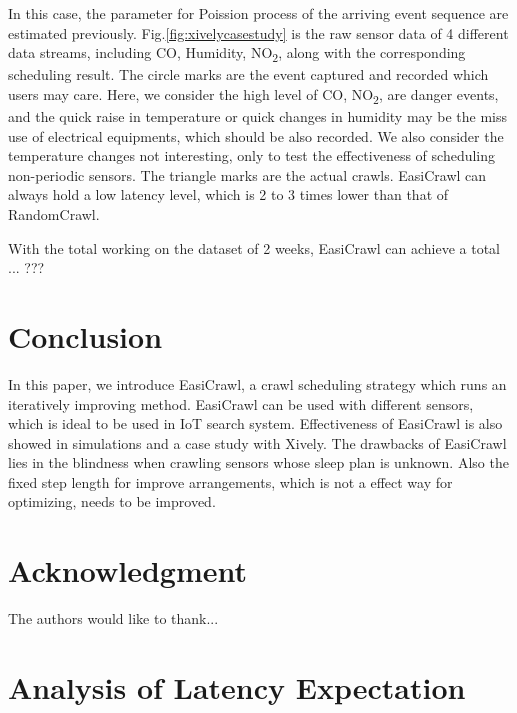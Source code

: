 \documentclass[conference]{IEEEtran}
\begin{document}
In this case, the parameter for Poission process of the arriving event sequence are estimated previously.
Fig.\ref{fig:xivelycasestudy} is the raw sensor data of 4 different data streams, including CO, Humidity, NO\textsubscript{2}, along with the corresponding scheduling result. The circle marks are the event captured and recorded which users may care. Here, we consider the high level of CO, NO\textsubscript{2}, are danger events, and the quick raise in temperature or quick changes in humidity may be the miss use of electrical equipments, which should be also recorded. We also consider the temperature changes not interesting, only to test the effectiveness of scheduling non-periodic sensors.
The triangle marks are the actual crawls. EasiCrawl can always hold a low latency level, which is 2 to 3 times lower than that of RandomCrawl.


With the total working on the dataset of 2 weeks, EasiCrawl can achieve a total ... ???


\section{Conclusion} \label{conclusion}

In this paper, we introduce EasiCrawl, a crawl scheduling strategy which runs an iteratively improving method. EasiCrawl can be used with different sensors, which is ideal to be used in IoT search system. Effectiveness of EasiCrawl is also showed in simulations and a case study with Xively. 
The drawbacks of EasiCrawl lies in the blindness when crawling sensors whose sleep plan is unknown. 
Also the fixed step length for improve arrangements, which is not a effect way for optimizing, needs to be improved.

\section*{Acknowledgment}


The authors would like to thank...


\ifCLASSOPTIONcaptionsoff
  \newpage
\fi





\appendices
\section{Analysis of Latency Expectation}
\end{document}
